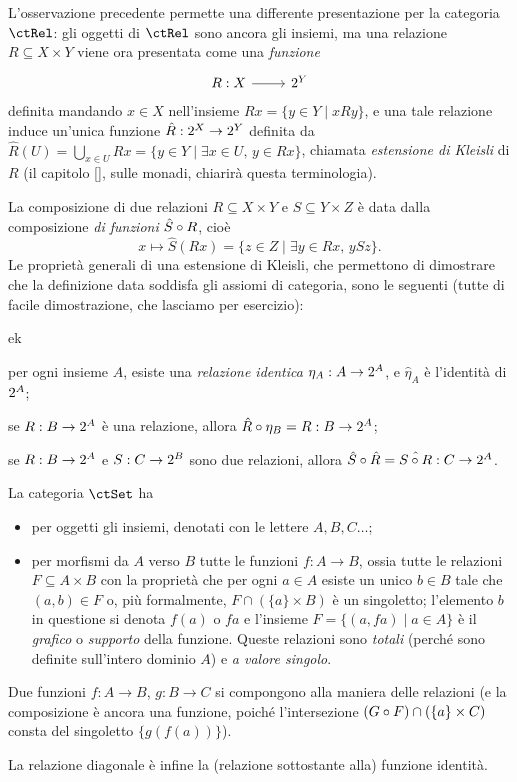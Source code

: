 \begin{remark}\label{diff_pres_cat_rel}
	L'osservazione precedente permette una differente presentazione per la categoria \(\ctRel\): gli oggetti di \(\ctRel\) sono ancora gli insiemi, ma una relazione \(R\subseteq X\times Y\) viene ora presentata come una \emph{funzione}
	\[\dmFun RX{\pow Y}\]
	definita mandando $x\in X$ nell'insieme $Rx = \{y\in Y\mid xRy\}$, e una tale relazione induce un'unica funzione $\hat R : 2^{X}\to 2^{Y}$ definita da $\hat R(U) = \bigcup_{x\in U}Rx = \{y\in Y\mid \exists x\in U,\, y\in Rx\}$, chiamata \emph{estensione di Kleisli} di $R$ (il capitolo \ref{}, sulle monadi, chiarirà questa terminologia).

	La composizione di due relazioni \(R\subseteq X\times Y\) e \(S\subseteq Y\times Z\) è data dalla composizione \emph{di funzioni} $\hat S\circ R$, cioè	
	\[
		x \mapsto \hat S(Rx) = \{z\in Z\mid \exists y\in Rx,\, ySz\}.
	\]
Le proprietà generali di una estensione di Kleisli, che permettono di dimostrare che la definizione data soddisfa gli assiomi di categoria, sono le seguenti (tutte di facile dimostrazione, che lasciamo per esercizio): 
\begin{enumtag}{ek}
	\item \label{ek_1} per ogni insieme $A$, esiste una \emph{relazione identica} $\eta_A : A\to 2^{A}$, e $\hat\eta_A$ è l'identità di $2^{A}$;
	\item \label{ek_2} se $R : B\to 2^{A}$ è una relazione, allora $\hat R\circ \eta_B = R : B \to2^{A}$;
	\item \label{ek_3} se $R : B\to 2^{A}$ e $S : C\to 2^{B}$ sono due relazioni, allora $\hat S\circ \hat R = \hat{S\circ R} : C\to 2^{A}$.
\end{enumtag} 
\end{remark}
\begin{example}\label{ex_cat_insiemi}
	La categoria \(\ctSet\) ha
	\begin{itemize}
		\item per oggetti gli insiemi, denotati con le lettere \(A,B,C\dots\);
		\item per morfismi da \(A\) verso \(B\) tutte le funzioni \(f : A\to B\), ossia tutte le relazioni \(F\subseteq A\times B\) con la proprietà che per ogni \(a\in A\) esiste un unico \(b\in B\) tale che \((a,b)\in F\) o, più formalmente, \(F\cap(\{a\}\times B)\) è un singoletto; l'elemento \(b\) in questione si denota \(f(a)\) o \(fa\) e l'insieme \(F = \{(a,fa)\mid a\in A\}\) è il \emph{grafico} o \emph{supporto} della funzione. Queste relazioni sono \emph{totali} (perché sono definite sull'intero dominio \(A\)) e \emph{a valore singolo}.
	\end{itemize}
	Due funzioni \(f : A\to B\), \(g : B\to C\) si compongono alla maniera delle relazioni (e la composizione è ancora una funzione, poiché l'intersezione \((G\circ F)\cap (\{a\}\times C)\) consta del singoletto \(\{g(f(a))\}\)).

	La relazione diagonale è infine la (relazione sottostante alla) funzione identità.
\end{example}
